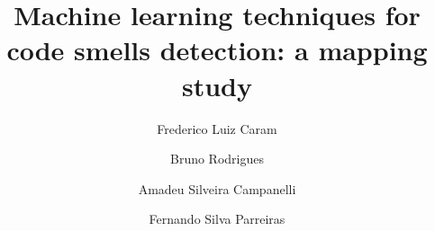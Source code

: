 \documentclass[preprint,review,12pt]{elsarticle}
\begin{document}
\begin{frontmatter}
\title{Machine learning techniques for code smells detection: a mapping study}

\author[mymainaddress]{Frederico Luiz Caram}

\author[mymainaddress]{Bruno Rodrigues}

\author[mymainaddress]{Amadeu Silveira Campanelli}

\author[mymainaddress]{Fernando Silva Parreiras}

\address[mymainaddress]{LAIS Laboratory for Advanced Information Systems, FUMEC University\\ Av. Afonso Pena 3880  \- Belo Horizonte \- MG \- Brazil \- +55 31 3269-5230}



\end{frontmatter}







\appendix
\end{document}
